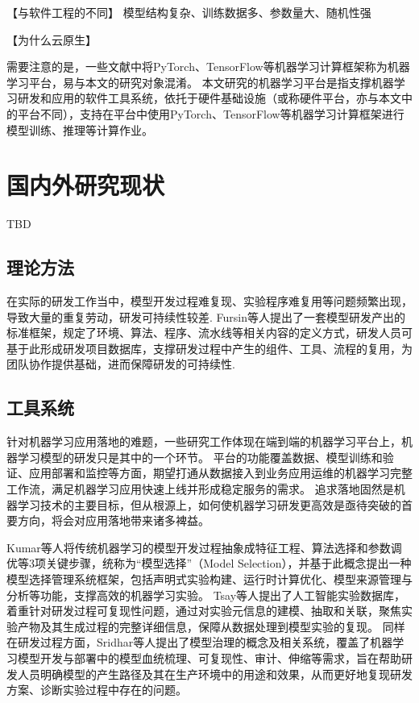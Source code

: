 【与软件工程的不同】
模型结构复杂、训练数据多、参数量大、随机性强

【为什么云原生】

需要注意的是，一些文献中将PyTorch、TensorFlow等机器学习计算框架称为机器学习平台，易与本文的研究对象混淆。
本文研究的机器学习平台是指支撑机器学习研发和应用的软件工具系统，依托于硬件基础设施（或称硬件平台，亦与本文中的平台不同），支持在平台中使用PyTorch、TensorFlow等机器学习计算框架进行模型训练、推理等计算作业。


%
\section{国内外研究现状}

TBD

\subsection{理论方法}

在实际的研发工作当中，模型开发过程难复现、实验程序难复用等问题频繁出现，导致大量的重复劳动，研发可持续性较差. Fursin等人\cite{Fur16}提出了一套模型研发产出的标准框架，规定了环境、算法、程序、流水线等相关内容的定义方式，研发人员可基于此形成研发项目数据库，支撑研发过程中产生的组件、工具、流程的复用，为团队协作提供基础，进而保障研发的可持续性. 


\subsection{工具系统}

针对机器学习应用落地的难题，一些研究工作体现在端到端的机器学习平台上\cite{Bay17, Sal18}，机器学习模型的研发只是其中的一个环节。
平台的功能覆盖数据、模型训练和验证、应用部署和监控等方面，期望打通从数据接入到业务应用运维的机器学习完整工作流\cite{Ame19}，满足机器学习应用快速上线并形成稳定服务的需求。
追求落地固然是机器学习技术的主要目标，但从根源上，如何使机器学习研发更高效是亟待突破的首要方向，将会对应用落地带来诸多裨益。

Kumar等人\cite{Kum16}将传统机器学习的模型开发过程抽象成特征工程、算法选择和参数调优等3项关键步骤，统称为“模型选择”（Model Selection），并基于此概念提出一种模型选择管理系统框架，包括声明式实验构建、运行时计算优化、模型来源管理与分析等功能，支撑高效的机器学习实验。
Tsay等人\cite{Tsa22}提出了人工智能实验数据库，着重针对研发过程可复现性问题，通过对实验元信息的建模、抽取和关联，聚焦实验产物及其生成过程的完整详细信息，保障从数据处理到模型实验的复现。
同样在研发过程方面，Sridhar等人\cite{Sri18}提出了模型治理的概念及相关系统，覆盖了机器学习模型开发与部署中的模型血统梳理、可复现性、审计、伸缩等需求，旨在帮助研发人员明确模型的产生路径及其在生产环境中的用途和效果，从而更好地复现研发方案、诊断实验过程中存在的问题。


